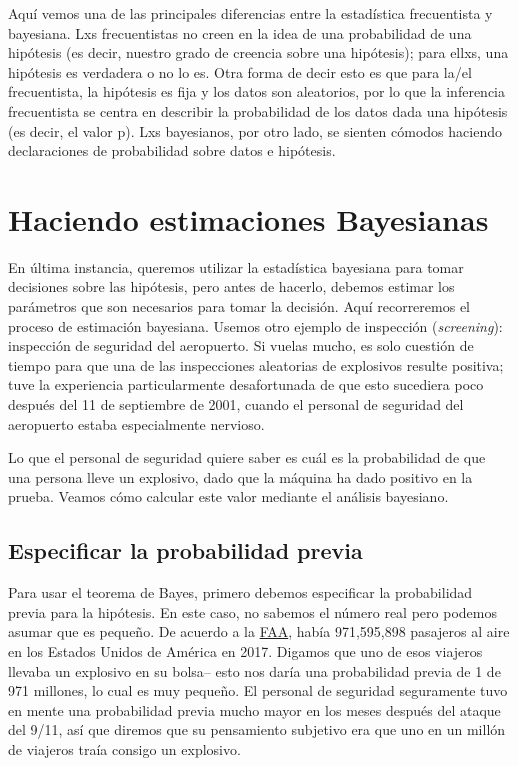 \documentclass[
  12pt,
]{book}
\begin{document}
Aquí vemos una de las principales diferencias entre la estadística frecuentista y bayesiana. Lxs frecuentistas no creen en la idea de una probabilidad de una hipótesis (es decir, nuestro grado de creencia sobre una hipótesis); para ellxs, una hipótesis es verdadera o no lo es. Otra forma de decir esto es que para la/el frecuentista, la hipótesis es fija y los datos son aleatorios, por lo que la inferencia frecuentista se centra en describir la probabilidad de los datos dada una hipótesis (es decir, el valor p). Lxs bayesianos, por otro lado, se sienten cómodos haciendo declaraciones de probabilidad sobre datos e hipótesis.

\hypertarget{doing-bayesian-estimation}{%
\section{Haciendo estimaciones Bayesianas}\label{doing-bayesian-estimation}}

En última instancia, queremos utilizar la estadística bayesiana para tomar decisiones sobre las hipótesis, pero antes de hacerlo, debemos estimar los parámetros que son necesarios para tomar la decisión. Aquí recorreremos el proceso de estimación bayesiana. Usemos otro ejemplo de inspección (\emph{screening}): inspección de seguridad del aeropuerto. Si vuelas mucho, es solo cuestión de tiempo para que una de las inspecciones aleatorias de explosivos resulte positiva; tuve la experiencia particularmente desafortunada de que esto sucediera poco después del 11 de septiembre de 2001, cuando el personal de seguridad del aeropuerto estaba especialmente nervioso.

Lo que el personal de seguridad quiere saber es cuál es la probabilidad de que una persona lleve un explosivo, dado que la máquina ha dado positivo en la prueba. Veamos cómo calcular este valor mediante el análisis bayesiano.

\hypertarget{especificar-la-probabilidad-previa}{%
\subsection{Especificar la probabilidad previa}\label{especificar-la-probabilidad-previa}}

Para usar el teorema de Bayes, primero debemos especificar la probabilidad previa para la hipótesis. En este caso, no sabemos el número real pero podemos asumar que es pequeño. De acuerdo a la \href{https://www.faa.gov/air_traffic/by_the_numbers/media/Air_Traffic_by_the_Numbers_2018.pdf}{FAA}, había 971,595,898 pasajeros al aire en los Estados Unidos de América en 2017. Digamos que uno de esos viajeros llevaba un explosivo en su bolsa-- esto nos daría una probabilidad previa de 1 de 971 millones, lo cual es muy pequeño. El personal de seguridad seguramente tuvo en mente una probabilidad previa mucho mayor en los meses después del ataque del 9/11, así que diremos que su pensamiento subjetivo era que uno en un millón de viajeros traía consigo un explosivo.
\end{document}
